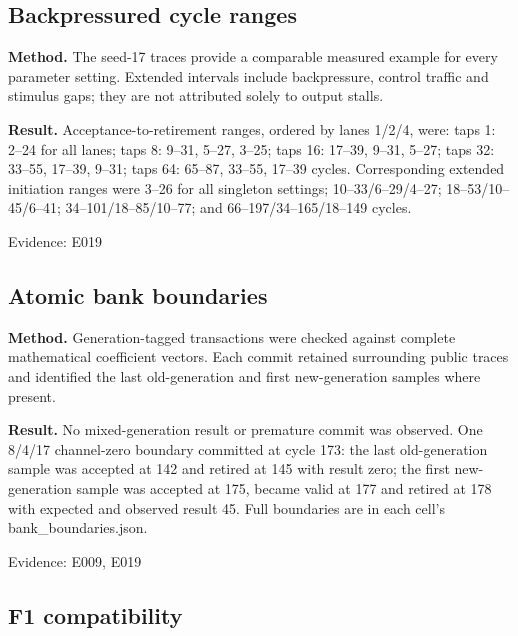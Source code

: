 \documentclass[11pt,a4paper]{article}
\begin{document}
\subsection{Backpressured cycle ranges}

\textbf{Method.} The seed-17 traces provide a comparable measured example for every parameter setting. Extended intervals include backpressure,\allowbreak{} control traffic and stimulus gaps; they are not attributed solely to output stalls.

\textbf{Result.} Acceptance-to-retirement ranges,\allowbreak{} ordered by lanes 1/\allowbreak{}2/\allowbreak{}4,\allowbreak{} were: taps 1: 2–24 for all lanes; taps 8: 9–31,\allowbreak{} 5–27,\allowbreak{} 3–25; taps 16: 17–39,\allowbreak{} 9–31,\allowbreak{} 5–27; taps 32: 33–55,\allowbreak{} 17–39,\allowbreak{} 9–31; taps 64: 65–87,\allowbreak{} 33–55,\allowbreak{} 17–39 cycles. Corresponding extended initiation ranges were 3–26 for all singleton settings; 10–33/\allowbreak{}6–29/\allowbreak{}4–27; 18–53/\allowbreak{}10–45/\allowbreak{}6–41; 34–101/\allowbreak{}18–85/\allowbreak{}10–77; and 66–197/\allowbreak{}34–165/\allowbreak{}18–149 cycles.

{\small Evidence: E019}

\subsection{Atomic bank boundaries}

\textbf{Method.} Generation-tagged transactions were checked against complete mathematical coefficient vectors. Each commit retained surrounding public traces and identified the last old-generation and first new-generation samples where present.

\textbf{Result.} No mixed-generation result or premature commit was observed. One 8/\allowbreak{}4/\allowbreak{}17 channel-zero boundary committed at cycle 173: the last old-generation sample was accepted at 142 and retired at 145 with result zero; the first new-generation sample was accepted at 175,\allowbreak{} became valid at 177 and retired at 178 with expected and observed result 45. Full boundaries are in each cell's bank\_\allowbreak{}boundaries.json.

{\small Evidence: E009,\allowbreak{} E019}

\subsection{F1 compatibility}
\end{document}
